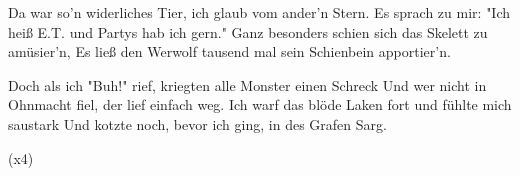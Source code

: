 \begin{guitar}
	Da war so'n widerliches Tier, ich glaub vom ander'n Stern.
	Es sprach zu mir: "Ich heiß E.T. und Partys hab ich gern."
	Ganz besonders schien sich das Skelett zu amüsier'n,
	Es ließ den Werwolf tausend mal sein Schienbein apportier'n.
	
	Doch als ich "Buh!" rief, kriegten alle Monster einen Schreck
	Und wer nicht in Ohnmacht fiel, der lief einfach weg.
	Ich warf das blöde Laken fort und fühlte mich saustark
	Und kotzte noch, bevor ich ging, in des Grafen Sarg.
	
	  (x4)
\end{guitar}
